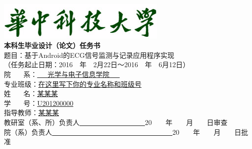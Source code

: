 \begin{titlepage}
\begin{center}
~~\\ 
\vspace{1cm}
\includegraphics[scale=1.3]{univ-title.png}
\\
\erhao
\vspace{1.3cm}
\zhongsong \textbf{本科生毕业设计（论文）任务书\\}
\vspace{2cm}
\fontsize{15.75pt}{20pt}\selectfont
{题目：基于Android的ECG信号监测与记录应用程序实现\\
\fontsize{12pt}{30pt}\selectfont
（任务起止日期：2016~~年~~2月22日～2016~~年~~6月12日）\\}
\vspace{2cm}
\fontsize{15.75pt}{48pt}\selectfont 
\zhongsong
院 \quad ~~~系：\underline{\quad \quad ~~~光学与电子信息学院~~~ \quad \quad}\\
专业班级：\underline{在这里写下你的专业名称和班级号} \\ 
姓 \quad ~~~名：\underline{\phantom{aaaaaaaaaaaaaa}某某某\phantom{aaaaaaaaaaaaa}} \\ 
学 \quad ~~~号：\underline{\phantom{aaaaaaaaaaa}U201200000\phantom{aaaaaaaaaaa}} \\ 
指导教师：\underline{\phantom{aaaaaaaaaaaaaa}某某某\phantom{aaaaaaaaaaaaa}} \\  
\vspace{2cm}
\fontsize{15.75pt}{23.65pt}\selectfont
教研室（系、所）负责人\underline{~~~~~~~~~~~~~~~~~~~}20~~~~年~~~~月~~~~日审查\\
院（系）负责人\underline{~~~~~~~~~~~~~~~~~~~~~~~~~~~~~~~~~~~}20~~~~年~~~~月~~~~日批准

\end{center}
\end{titlepage}
